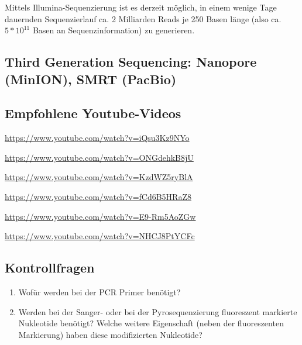 Mittels Illumina-Sequenzierung ist es derzeit möglich, in einem wenige Tage dauernden Sequenzierlauf ca. 2 Milliarden Reads je 250 Basen länge (also ca. $5*10^{11}$ Basen an Sequenzinformation) zu generieren.

\subsection{Third Generation Sequencing: Nanopore (MinION), SMRT (PacBio)}

\subsection{Empfohlene Youtube-Videos}
\begin{description}[align=left]
	\item [PCR] \href{https://www.youtube.com/watch?v=iQsu3Kz9NYo}{https://www.youtube.com/watch?v=iQsu3Kz9NYo}
	\item [Sanger-Sequenzierung] \href{https://www.youtube.com/watch?v=ONGdehkB8jU}{https://www.youtube.com/watch?v=ONGdehkB8jU}
	\item [454-Sequenzierung] \href{https://www.youtube.com/watch?v=KzdWZ5ryBlA}{https://www.youtube.com/watch?v=KzdWZ5ryBlA}
	\item [Illumina-Sequenzierung] \href{https://www.youtube.com/watch?v=fCd6B5HRaZ8}{https://www.youtube.com/watch?v=fCd6B5HRaZ8}
	\item [Nanopore-Sequenzierung] \href{https://www.youtube.com/watch?v=E9-Rm5AoZGw}{https://www.youtube.com/watch?v=E9-Rm5AoZGw}
	\item [SMRT-Sequenzierung] \href{https://www.youtube.com/watch?v=NHCJ8PtYCFc}{https://www.youtube.com/watch?v=NHCJ8PtYCFc}
\end{description}

\subsection{Kontrollfragen}
\begin{enumerate}
	\item Wofür werden bei der PCR Primer benötigt?
	\item Werden bei der Sanger- oder bei der Pyrosequenzierung fluoreszent markierte Nukleotide benötigt? Welche weitere Eigenschaft (neben der fluoreszenten Markierung) haben diese modifizierten Nukleotide?
\end{enumerate}
